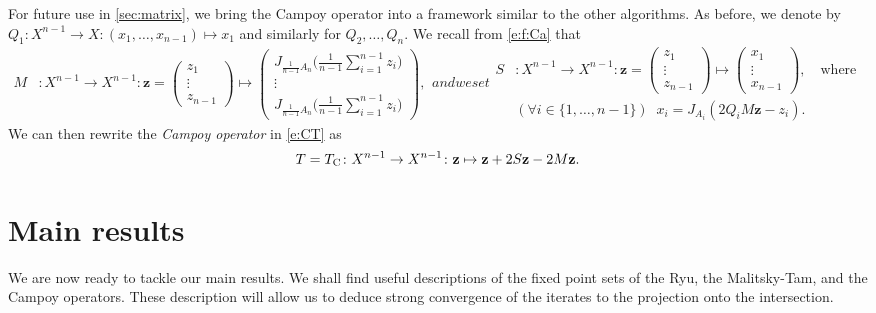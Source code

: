 \documentclass[11pt]{article}
\newcommand{\bz}{\ensuremath{\mathbf{z}}}
\newcommand{\tc}{\ensuremath{T_{\text{\scriptsize C}}}}
\theoremstyle{definition}
\begin{document}
{For future use in \cref{sec:matrix}, we bring the Campoy operator into a framework 
similar to the other algorithms. As before, we denote by $Q_1\colon X^{n-1} \to X\colon 
(x_1,\ldots,x_{n-1})\mapsto x_1$
and similarly for $Q_2,\ldots,Q_n$. 
We recall from \cref{e:f:Ca} that  
\begin{subequations}
\begin{align}
\label{e:CampoyM}
M &: 
X^{n-1}\to X^{n-1} : 
\bz = 
\begin{pmatrix}
z_{1}\\
\vdots\\
z_{n-1}
\end{pmatrix}
\mapsto
\begin{pmatrix}
J_{\frac{1}{n-1}A_n}\Big(\frac{1}{n-1}\sum_{i=1}^{n-1}z_{i}\Big)\\
\vdots\\
J_{\frac{1}{n-1}A_n}\Big(\frac{1}{n-1}\sum_{i=1}^{n-1}z_{i}\Big)
\end{pmatrix}, 
\end{align}
and we set
\begin{align}
\label{e:CampoyS}
S&:X^{n-1}\to X^{n-1}:
\bz = \begin{pmatrix}
z_{1}\\
\vdots\\
z_{n-1}
\end{pmatrix}
\mapsto
\begin{pmatrix}
x_{1}\\
\vdots\\
x_{n-1}
\end{pmatrix},
\quad\text{where}\;\;
\\[+2mm]
&(\forall i\in\{1,\ldots,n-1\})
\;\;
x_{i} = J_{A_i}(2Q_iM\bz- z_{i}). 
\end{align}
\end{subequations}
We can then rewrite the \emph{Campoy operator} in \cref{e:CT} as
 \begin{equation}
 \label{e:CampoyT}
 T = \tc \colon X^{n-1}\to X^{n-1}\colon 
 \bz\mapsto 
 \bz+ 2S\bz - 2M\bz. 
 \end{equation}

\section{Main results}

We are now ready to tackle our main results.
We shall find useful descriptions of the fixed point sets
of the Ryu, the Malitsky-Tam, and the Campoy operators.
These description will allow us to deduce strong convergence of the 
iterates to the projection
onto the intersection. 

}
\end{document}
